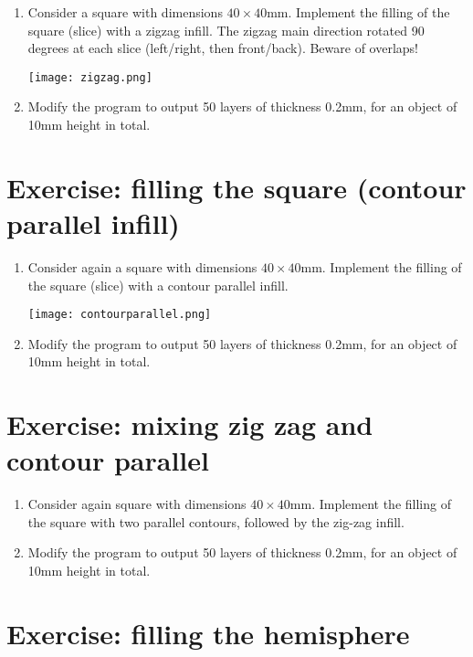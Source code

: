 \documentclass{article}
\begin{document}
\begin{enumerate}
    \item Consider a square with dimensions $40 \times 40$mm.
Implement the filling of the square (slice) with a zigzag infill.
The zigzag main direction rotated 90 degrees at each slice (left/right, then front/back).
Beware of overlaps!

\begin{center}
\texttt{[image: zigzag.png]}
\end{center}

\item Modify the program to output 50 layers of thickness 0.2mm, for an object of 10mm height in total.
\end{enumerate}

\section{Exercise: filling the square (contour parallel infill)}

\begin{enumerate}
    \item Consider again a square with dimensions $40 \times 40$mm.
Implement the filling of the square (slice) with a contour parallel infill.

\begin{center}
\texttt{[image: contourparallel.png]}
\end{center}

\item Modify the program to output 50 layers of thickness 0.2mm, for an object of 10mm height in total.
\end{enumerate}

\section{Exercise: mixing zig zag and contour parallel}

\begin{enumerate}
\item Consider again square with dimensions $40 \times 40$mm.
Implement the filling of the square with two parallel contours, followed by the zig-zag infill.
\item Modify the program to output 50 layers of thickness 0.2mm, for an object of 10mm height in total.
\end{enumerate}

\section{Exercise: filling the hemisphere}
\end{document}
